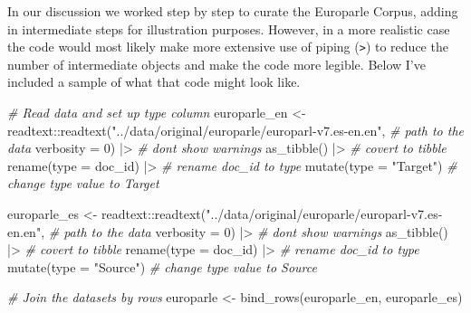 \documentclass[
  letterpaper,
  DIV=11,
  numbers=noendperiod]{scrreport}
\newenvironment{Shaded}{\begin{snugshade}}{\end{snugshade}}
\newcommand{\AttributeTok}[1]{\textcolor[rgb]{0.00,0.00,0.00}{#1}}
\newcommand{\CommentTok}[1]{\textcolor[rgb]{0.00,0.00,0.00}{\textit{#1}}}
\newcommand{\DecValTok}[1]{\textcolor[rgb]{0.00,0.00,0.00}{#1}}
\newcommand{\FunctionTok}[1]{\textcolor[rgb]{0.00,0.00,0.00}{#1}}
\newcommand{\NormalTok}[1]{\textcolor[rgb]{0.00,0.00,0.00}{#1}}
\newcommand{\OtherTok}[1]{\textcolor[rgb]{0.00,0.00,0.00}{#1}}
\newcommand{\SpecialCharTok}[1]{\textcolor[rgb]{0.00,0.00,0.00}{#1}}
\newcommand{\StringTok}[1]{\textcolor[rgb]{0.00,0.00,0.00}{#1}}
\theoremstyle{definition}
\theoremstyle{remark}
\begin{document}
In our discussion we worked step by step to curate the Europarle Corpus,
adding in intermediate steps for illustration purposes. However, in a
more realistic case the code would most likely make more extensive use
of piping (\texttt{\textbar{}\textgreater{}}) to reduce the number of
intermediate objects and make the code more legible. Below I've included
a sample of what that code might look like.

\begin{Shaded}
\begin{Highlighting}[]
\CommentTok{\# Read data and set up \textasciigrave{}type\textasciigrave{} column}
\NormalTok{europarle\_en }\OtherTok{\textless{}{-}}  
\NormalTok{  readtext}\SpecialCharTok{::}\FunctionTok{readtext}\NormalTok{(}\StringTok{"../data/original/europarle/europarl{-}v7.es{-}en.en"}\NormalTok{, }\CommentTok{\# path to the data}
                     \AttributeTok{verbosity =} \DecValTok{0}\NormalTok{) }\SpecialCharTok{|\textgreater{}} \CommentTok{\# don\textquotesingle{}t show warnings}
  \FunctionTok{as\_tibble}\NormalTok{() }\SpecialCharTok{|\textgreater{}} \CommentTok{\# covert to tibble}
  \FunctionTok{rename}\NormalTok{(}\AttributeTok{type =}\NormalTok{ doc\_id) }\SpecialCharTok{|\textgreater{}} \CommentTok{\# rename doc\_id to type}
  \FunctionTok{mutate}\NormalTok{(}\AttributeTok{type =} \StringTok{"Target"}\NormalTok{) }\CommentTok{\# change type value to \textquotesingle{}Target\textquotesingle{}}

\NormalTok{europarle\_es }\OtherTok{\textless{}{-}} 
\NormalTok{  readtext}\SpecialCharTok{::}\FunctionTok{readtext}\NormalTok{(}\StringTok{"../data/original/europarle/europarl{-}v7.es{-}en.en"}\NormalTok{, }\CommentTok{\# path to the data}
                     \AttributeTok{verbosity =} \DecValTok{0}\NormalTok{) }\SpecialCharTok{|\textgreater{}}  \CommentTok{\# don\textquotesingle{}t show warnings}
  \FunctionTok{as\_tibble}\NormalTok{() }\SpecialCharTok{|\textgreater{}} \CommentTok{\# covert to tibble}
  \FunctionTok{rename}\NormalTok{(}\AttributeTok{type =}\NormalTok{ doc\_id) }\SpecialCharTok{|\textgreater{}} \CommentTok{\# rename doc\_id to type}
  \FunctionTok{mutate}\NormalTok{(}\AttributeTok{type =} \StringTok{"Source"}\NormalTok{) }\CommentTok{\# change type value to \textquotesingle{}Source\textquotesingle{}}

\CommentTok{\# Join the datasets by rows}
\NormalTok{europarle }\OtherTok{\textless{}{-}} 
  \FunctionTok{bind\_rows}\NormalTok{(europarle\_en, europarle\_es)}


\end{Highlighting}
\end{Shaded}
\end{document}
